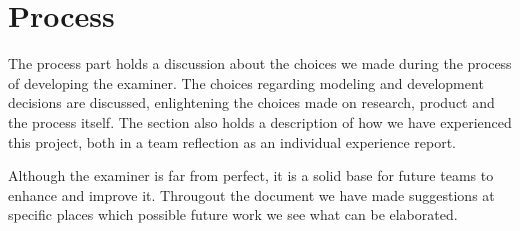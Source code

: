 



\section{Process}

The process part holds a discussion about the choices we made
during the process of developing the \gls{examiner}. The choices regarding 
modeling and development decisions are discussed, enlightening the choices made
on research, product and the process itself. The section also holds a description
of how we have experienced this project, both in a team reflection as an 
individual experience report.



Although the \gls{examiner} is far from perfect, it is a solid base for future
teams to enhance and improve it.
Througout the document we have made suggestions at specific places which possible
future work we see what can be elaborated.